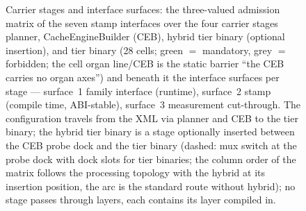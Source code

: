 \begin{nurkurz}
\begin{figure}[htbp]
\caption{Carrier stages and interface surfaces: the three-valued admission matrix of the seven stamp interfaces over the four carrier stages planner, CacheEngineBuilder (CEB), hybrid tier binary (optional insertion), and tier binary (28 cells; green $=$ mandatory, grey $=$ forbidden; the cell organ line/CEB is the static barrier \enquote{the CEB carries no organ axes}) and beneath it the interface surfaces per stage --- surface~1 family interface (runtime), surface~2 stamp (compile time, ABI-stable), surface~3 measurement cut-through. The configuration travels from the XML via planner and CEB to the tier binary; the hybrid tier binary is a stage optionally inserted between the CEB probe dock and the tier binary (dashed: mux switch at the probe dock with dock slots for tier binaries; the column order of the matrix follows the processing topology with the hybrid at its insertion position, the arc is the standard route without hybrid); no stage passes through layers, each contains its layer compiled in.}\label{fig:traeger-flaechen}
\end{figure}
\end{nurkurz}

